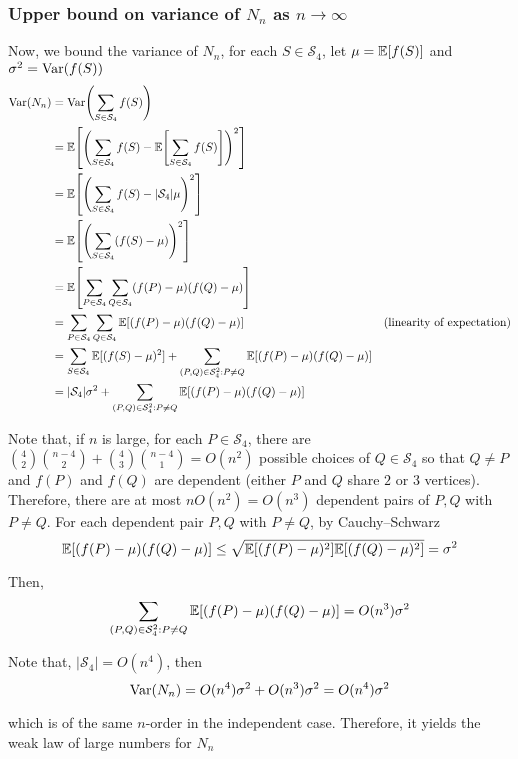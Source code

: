 \documentclass{article}
\begin{document}
\subsubsection{Upper bound on variance of $N_n$ as $n \to \infty$}

Now, we bound the variance of $N_n$, for each $S \in \mathcal{S}_4$, let $\mu = \mathbb{E}[f(S)]$ and $\sigma^2 = \operatorname{Var}(f(S))$
\begin{align*}
    \Var(N_n)
    &= \Var\tuple*{\sum_{S \in \mathcal{S}_4} f(S)} \\
    &= \Exp\bracket*{
    \tuple*{\sum_{S \in \mathcal{S}_4} f(S) - \Exp\bracket*{\sum_{S \in \mathcal{S}_4} f(S)}}^2} \\
    &= \Exp\bracket*{
    \tuple*{\sum_{S \in \mathcal{S}_4} f(S) - |\mathcal{S}_4| \mu}^2} \\
    &= \Exp\bracket*{
    \tuple*{\sum_{S \in \mathcal{S}_4} (f(S) - \mu)}^2} \\
    &= \Exp\bracket*{
    \sum_{P \in \mathcal{S}_4} \sum_{Q \in \mathcal{S}_4} (f(P) - \mu)(f(Q) - \mu)} \\
    &= 
    \sum_{P \in \mathcal{S}_4} \sum_{Q \in \mathcal{S}_4} \Exp[(f(P) - \mu)(f(Q) - \mu)] &\text{(linearity of expectation)} \\
    &= 
    \sum_{S \in \mathcal{S}_4} \Exp[(f(S) - \mu)^2] + \sum_{(P, Q) \in \mathcal{S}_4^2: P \neq Q} \Exp[(f(P) - \mu)(f(Q) - \mu)] \\
    &= |\mathcal{S}_4| \sigma^2 + \sum_{(P, Q) \in \mathcal{S}_4^2: P \neq Q} \Exp[(f(P) - \mu)(f(Q) - \mu)]
\end{align*}

Note that, if $n$ is large, for each $P \in \mathcal{S}_4$, there are ${4 \choose 2} {n-4 \choose 2} + {4 \choose 3} {n-4 \choose 1} = O(n^2)$ possible choices of $Q \in \mathcal{S}_4$ so that $Q \neq P$ and $f(P)$ and $f(Q)$ are dependent (either $P$ and $Q$ share $2$ or $3$ vertices). Therefore, there are at most $n O(n^2) = O(n^3)$ dependent pairs of $P, Q$ with $P \neq Q$. For each dependent pair $P, Q$ with $P \neq Q$, by Cauchy–Schwarz
$$
    \mathbb{E}[(f(P) - \mu)(f(Q) - \mu)] \leq \sqrt{\mathbb{E}[(f(P) - \mu)^2] \mathbb{E}[(f(Q) - \mu)^2]} = \sigma^2
$$

Then, 
$$
    \sum_{(P, Q) \in \mathcal{S}_4^2: P \neq Q} \mathbb{E}[(f(P) - \mu)(f(Q) - \mu)] = O(n^3) \sigma^2
$$

Note that, $|\mathcal{S}_4| = O(n^4)$, then
$$
    \operatorname{Var}(N_n) = O(n^4) \sigma^2 + O(n^3) \sigma^2 = O(n^4) \sigma^2
$$

which is of the same $n$-order in the independent case. Therefore, it yields the weak law of large numbers for $N_n$
\end{document}
